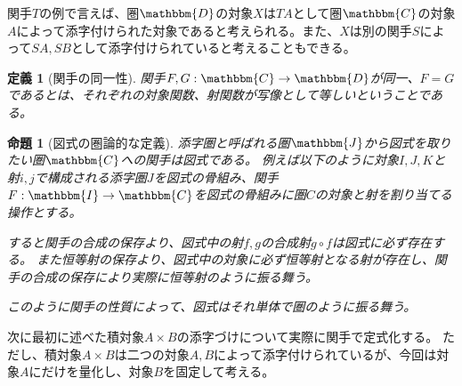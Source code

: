 \documentclass[uplatex,dvipdfmx]{jsarticle}
\newcommand{\cat}[1]{\mathbbm{#1}}
\newcommand{\arrow}{\rightarrow}
\newcommand{\functor}[3]{#1:\cat{#2}\arrow \cat{#3}}
\newtheorem{prop}[proof]{命題}
\newtheorem{define}[proof]{定義}
\numberwithin{proof}{subsection}
\begin{document}
  関手$T$の例で言えば、圏$\cat{D}$の対象$X$は$TA$として圏$\cat{C}$の対象$A$によって添字付けられた対象であると考えられる。また、$X$は別の関手$S$によって$SA,SB$として添字付けられていると考えることもできる。

	\begin{define}[関手の同一性]
		関手$\functor{F,G}{C}{D}$が同一、$F=G$であるとは、それぞれの対象関数、射関数が写像として等しいということである。
	\end{define}


	\begin{prop}[図式の圏論的な定義]
		添字圏と呼ばれる圏$\cat{J}$から図式を取りたい圏$\cat{C}$への関手は図式である。
		例えば以下のように対象$I,J,K$と射$i,j$で構成される添字圏$J$を図式の骨組み、関手$\functor{F}{I}{C}$を図式の骨組みに圏$C$の対象と射を割り当てる操作とする。

		すると関手の合成の保存より、図式中の射$f,g$の合成射$g\circ f$は図式に必ず存在する。
    また恒等射の保存より、図式中の対象に必ず恒等射となる射が存在し、関手の合成の保存により実際に恒等射のように振る舞う。

    このように関手の性質によって、図式はそれ単体で圏のように振る舞う。
		\begin{center}
		\end{center}
	\end{prop}
  次に最初に述べた積対象$A\times B$の添字づけについて実際に関手で定式化する。
  ただし、積対象$A\times B$は二つの対象$A,B$によって添字付けられているが、今回は対象$A$にだけを量化し、対象$B$を固定して考える。
\end{document}
